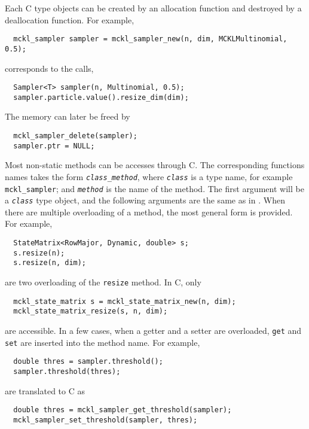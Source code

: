 Each C type objects can be created by an allocation function and destroyed by a
deallocation function. For example,
\begin{Verbatim}
  mckl_sampler sampler = mckl_sampler_new(n, dim, MCKLMultinomial, 0.5);
\end{Verbatim}
corresponds to the \cpp calls,
\begin{Verbatim}
  Sampler<T> sampler(n, Multinomial, 0.5);
  sampler.particle.value().resize_dim(dim);
\end{Verbatim}
The memory can later be freed by
\begin{Verbatim}
  mckl_sampler_delete(sampler);
  sampler.ptr = NULL;
\end{Verbatim}
Most non-static methods can be accesses through C. The corresponding functions
names takes the form
\texttt{\textcolor{MRed}{\textit{class}}\_\textcolor{MRed}{\textit{method}}},
where \texttt{\textcolor{MRed}{\textit{class}}} is a type name, for example
\verb|mckl_sampler|; and \texttt{\textcolor{MRed}{\textit{method}}} is the name
of the method. The first argument will be a
\texttt{\textcolor{MRed}{\textit{class}}} type object, and the following
arguments are the same as in \cpp. When there are multiple overloading of a
method, the most general form is provided. For example,
\begin{Verbatim}
  StateMatrix<RowMajor, Dynamic, double> s;
  s.resize(n);
  s.resize(n, dim);
\end{Verbatim}
are two overloading of the \verb|resize| method. In C, only
\begin{Verbatim}
  mckl_state_matrix s = mckl_state_matrix_new(n, dim);
  mckl_state_matrix_resize(s, n, dim);
\end{Verbatim}
are accessible. In a few cases, when a getter and a setter are overloaded,
\verb|get| and \verb|set| are inserted into the method name. For example,
\begin{Verbatim}
  double thres = sampler.threshold();
  sampler.threshold(thres);
\end{Verbatim}
are translated to C as
\begin{Verbatim}
  double thres = mckl_sampler_get_threshold(sampler);
  mckl_sampler_set_threshold(sampler, thres);
\end{Verbatim}

